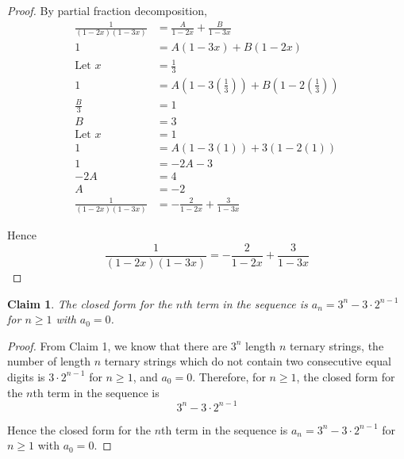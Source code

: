 \documentclass{article}
\newtheorem{claim}{Claim}
\begin{document}
\begin{proof}
    By partial fraction decomposition,
    \[
    \begin{aligned}
    \frac{1}{(1 - 2x)(1 - 3x)} &= \frac{A}{1 - 2x} + \frac{B}{1 - 3x} \\
    1 &= A(1 - 3x) + B(1 - 2x) \\
    \text{Let } x &= \frac{1}{3} \\
    1 &= A\left(1 - 3\left(\frac{1}{3}\right)\right) + B\left(1 - 2\left(\frac{1}{3}\right)\right) \\
    \frac{B}{3} &= 1 \\
    B &= 3 \\
    \text{Let } x &= 1 \\
    1 &= A(1 - 3(1)) + 3(1 - 2(1)) \\
    1 &= -2A - 3 \\
    -2A &= 4 \\
    A &= -2 \\
    \frac{1}{(1 - 2x)(1 - 3x)} &= -\frac{2}{1 - 2x} + \frac{3}{1 - 3x}
    \end{aligned}
    \]

    \medskip

    Hence
    \[
    \frac{1}{(1 - 2x)(1 - 3x)} = -\frac{2}{1 - 2x} + \frac{3}{1 - 3x}
    \]
\end{proof}

\begin{claim}
    The closed form for the $n$th term in the sequence is $a_n = 3^n - 3\cdot 2^{n-1}$ for $n \ge 1$ with 
    $a_0 = 0$.
\end{claim}

\begin{proof}
    From Claim 1, we know that there are $3^n$ length $n$ ternary strings, the number of length $n$ 
    ternary strings which do not contain two consecutive equal digits is $3 \cdot 2^{n-1}$ for $n \ge 1$, 
    and $a_0 = 0$. Therefore, for $n \ge 1$, the closed form for the $n$th term in the sequence is
    \[
    3^n - 3 \cdot 2^{n-1}
    \]

    \medskip

    Hence the closed form for the $n$th term in the sequence is $a_n = 3^n - 3 \cdot 2^{n-1}$ for $n \ge 1$ 
    with $a_0 = 0$.
\end{proof}
\end{document}
